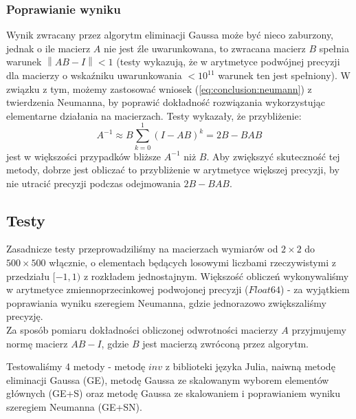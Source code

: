 \documentclass{article}
\newcommand{\norm}[1]{\left\lVert#1\right\rVert}
\begin{document}
\subsubsection{Poprawianie wyniku}

Wynik zwracany przez algorytm eliminacji Gaussa może być nieco zaburzony, jednak o ile macierz $A$ nie jest źle uwarunkowana, to zwracana macierz $B$ spełnia warunek $\norm{AB - I} < 1$ (testy wykazują, że w arytmetyce podwójnej precyzji dla macierzy o wskaźniku uwarunkowania $< 10^{11}$ warunek ten jest spełniony). W związku z tym, możemy zastosować wniosek (\ref{eq:conclusion:neumann}) z twierdzenia Neumanna, by poprawić dokładność rozwiązania wykorzystując elementarne działania na macierzach. Testy wykazały, że przybliżenie:
\begin{equation}
A^{-1} \approx B\sum_{k=0}^{1}(I - AB)^k = 2B-BAB
\end{equation}
jest w większości przypadków bliższe $A^{-1}$ niż $B$. Aby zwiększyć skuteczność tej metody, dobrze jest obliczać to przybliżenie w arytmetyce większej precyzji, by nie utracić precyzji podczas odejmowania $2B - BAB$.

\subsection{Testy}

Zasadnicze testy przeprowadziliśmy na macierzach wymiarów od $2\times 2$ do $500\times 500$ włącznie, o elementach będących losowymi liczbami rzeczywistymi z przedziału $[-1, 1)$ z rozkładem jednostajnym. Większość obliczeń wykonywaliśmy w arytmetyce zmiennoprzecinkowej podwojonej precyzji ($Float64$) - za wyjątkiem poprawiania wyniku szeregiem Neumanna, gdzie jednorazowo zwiększaliśmy precyzję. \\

Za sposób pomiaru dokładności obliczonej odwrotności macierzy $A$ przyjmujemy normę macierz $AB - I$, gdzie $B$ jest macierzą zwróconą przez algorytm.

Testowaliśmy 4 metody - metodę $inv$ z biblioteki języka Julia, naiwną metodę eliminacji Gaussa (GE), metodę Gaussa ze skalowanym wyborem elementów głównych (GE+S) oraz metodę Gaussa ze skalowaniem i poprawianiem wyniku szeregiem Neumanna (GE+SN).
\end{document}
